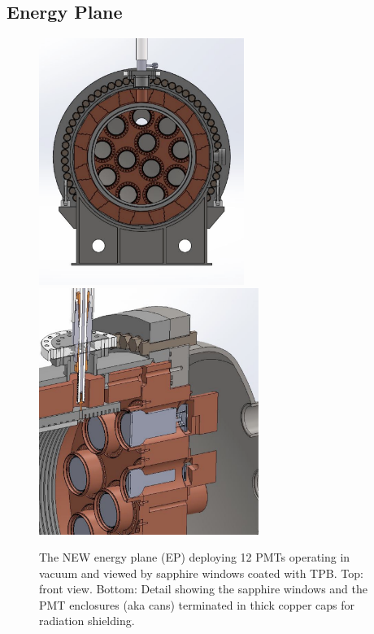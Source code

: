 \subsection{Energy Plane}
\begin{figure}[hpt!]
\centering
\includegraphics[height=8cm]{img/NEPFrontView.pdf}
\includegraphics[height=8cm]{img/NEPDetail.pdf}
\caption{The NEW energy plane (EP) deploying 12 PMTs operating in vacuum
and viewed by sapphire windows coated with TPB. Top: front view. Bottom: Detail showing the sapphire windows and the PMT enclosures (aka cans) terminated in thick copper caps for radiation shielding.} \label{fig:NEP}
\end{figure}


